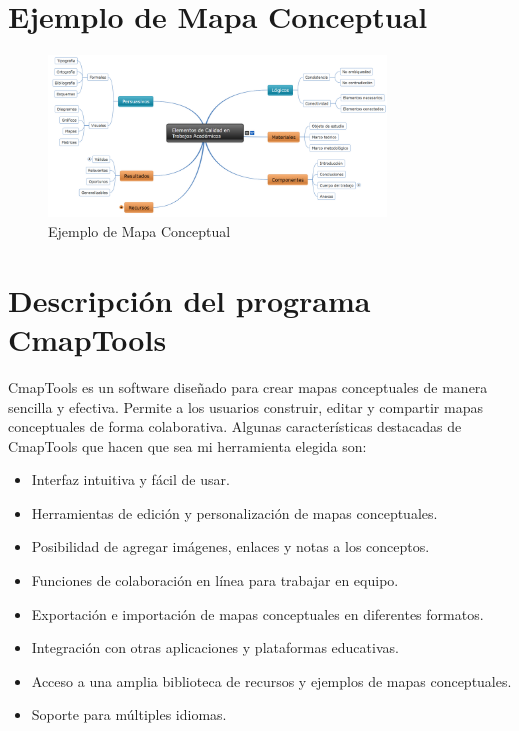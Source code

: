 \documentclass[12pt, a4paper, twoside]{article}
\begin{document}
\section{Ejemplo de Mapa Conceptual}
\begin{figure}[h]
    \centering
    \includegraphics[width=0.8\textwidth]{ejemplomc.png}
    \caption{Ejemplo de Mapa Conceptual}
    \label{fig:mapa_conceptual}
\end{figure}
\section{Descripción del programa CmapTools}
CmapTools es un software diseñado para crear mapas conceptuales de manera sencilla y efectiva. 
Permite a los usuarios construir, editar y compartir mapas conceptuales 
de forma colaborativa. Algunas características destacadas de CmapTools que hacen que sea 
mi herramienta elegida son:
\begin{itemize}
    \item Interfaz intuitiva y fácil de usar.
    \item Herramientas de edición y personalización de mapas conceptuales.
    \item Posibilidad de agregar imágenes, enlaces y notas a los conceptos.
    \item Funciones de colaboración en línea para trabajar en equipo.
    \item Exportación e importación de mapas conceptuales en diferentes formatos.
    \item Integración con otras aplicaciones y plataformas educativas.
    \item Acceso a una amplia biblioteca de recursos y ejemplos de mapas conceptuales.
    \item Soporte para múltiples idiomas.
\end{itemize}
\end{document}
